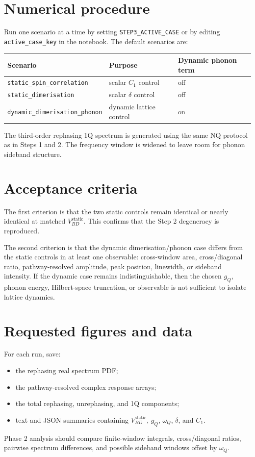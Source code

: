\documentclass[11pt]{article}
\begin{document}
\section{Numerical procedure}
Run one scenario at a time by setting \texttt{STEP3\_ACTIVE\_CASE} or by
editing \texttt{active\_case\_key} in the notebook.  The default scenarios are:
\begin{center}
\begin{tabular}{lll}
\toprule
Scenario & Purpose & Dynamic phonon term \\
\midrule
\texttt{static\_spin\_correlation} & scalar $C_1$ control & off \\
\texttt{static\_dimerisation} & scalar $\delta$ control & off \\
\texttt{dynamic\_dimerisation\_phonon} & dynamic lattice control & on \\
\bottomrule
\end{tabular}
\end{center}
The third-order rephasing 1Q spectrum is generated using the same NQ protocol
as in Steps 1 and 2.  The frequency window is widened to leave room for phonon
sideband structure.

\section{Acceptance criteria}
The first criterion is that the two static controls remain identical or nearly
identical at matched $V_{BD}^{\mathrm{static}}$.  This confirms that the Step 2
degeneracy is reproduced.

The second criterion is that the dynamic dimerisation/phonon case differs from
the static controls in at least one observable: cross-window area,
cross/diagonal ratio, pathway-resolved amplitude, peak position, linewidth,
or sideband intensity.  If the dynamic case remains indistinguishable, then the
chosen $g_Q$, phonon energy, Hilbert-space truncation, or observable is not
sufficient to isolate lattice dynamics.

\section{Requested figures and data}
For each run, save:
\begin{itemize}
\item the rephasing real spectrum PDF;
\item the pathway-resolved complex response arrays;
\item the total rephasing, unrephasing, and 1Q components;
\item text and JSON summaries containing $V_{BD}^{\mathrm{static}}$, $g_Q$,
$\omega_Q$, $\delta$, and $C_1$.
\end{itemize}
Phase 2 analysis should compare finite-window integrals, cross/diagonal ratios,
pairwise spectrum differences, and possible sideband windows offset by
$\omega_Q$.
\end{document}
